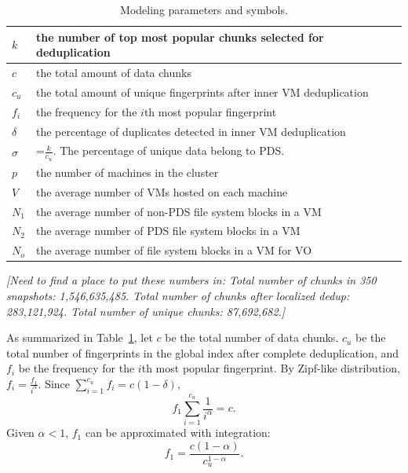\begin{table}[ht]
\centering
\begin{tabular}{|p{1.25cm}|p{5.5cm}|}
\hline
$k$ &  the number of top most popular chunks selected for deduplication\\ 
\hline
$c$ &  the total amount of data chunks\\ 
\hline
$c_u$ &  the total amount of unique fingerprints after inner VM  deduplication\\
\hline
$f_i$ &  the frequency for the $i$th most popular fingerprint\\
\hline
$\delta$ &  the percentage of duplicates detected in inner VM deduplication\\
\hline
$\sigma$ & =$\frac{k}{c_u}$.  The percentage of unique data  belong to  PDS.\\
\hline
$p$ & the number of machines in the cluster\\
\hline
$V$ & the average number of VMs hosted on each machine\\
\hline
$N_1$ & the average number  of non-PDS file system blocks  in a VM\\
\hline
$N_2$ & the average number  of PDS file system blocks  in a VM\\
\hline
$N_o$ & the average number  of file system blocks  in a VM for VO\\
\hline
\end{tabular}
\caption{Modeling  parameters and symbols.}
\label{tab:symbol}
\end{table}

{\it [Need to find a place to put these numbers in: Total number of chunks 
in 350 snapshots: 1,546,635,485. 
Total number of chunks after localized dedup: 283,121,924. Total number of unique chunks: 87,692,682.]}

As summarized in Table~\ref{tab:symbol},
let $c$ be the total number of data chunks. 
$c_u$ be the total number of fingerprints 
in the global index after complete deduplication, and
$f_i$ be the frequency for the $i$th most popular fingerprint. 
By Zipf-like distribution, $f_i = \frac{f_1}{i^\alpha}.$
Since $ \sum_{i=1}^{c_u}f_i = c (1-\delta)$,
\[
f_1 \sum_{i=1}^{c_u}\frac{1}{i^\alpha} = c.
\]
Given $\alpha <1$, $f_1$ can be approximated with integration:
\begin{equation}
f_1=\frac{c(1-\alpha)}{c_u^{1-\alpha}}.
\end{equation}

